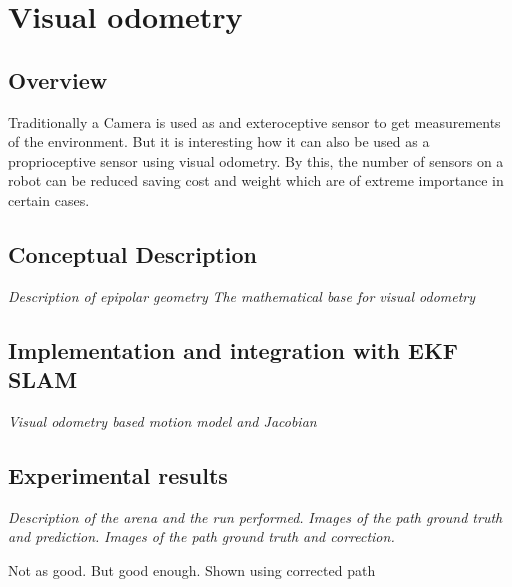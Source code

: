 \chapter{Visual odometry}

\section{Overview}

Traditionally a Camera is used as and exteroceptive sensor to get measurements of the environment. But it is interesting how it can also be used as a proprioceptive sensor using visual odometry\cite{}. By this, the number of sensors on a robot can be reduced saving cost and weight which are of extreme importance in certain cases. 


\section{Conceptual Description}
\textit{Description of epipolar geometry}
\textit{The mathematical base for visual odometry}

\section{Implementation and integration with EKF SLAM}
\textit{Visual odometry based motion model and Jacobian}

\section{Experimental results}
\textit{Description of the arena and the run performed.}
\textit{Images of the path ground truth and prediction.}
\textit{Images of the path ground truth and correction.}

Not as good. But good enough. Shown using corrected path
 